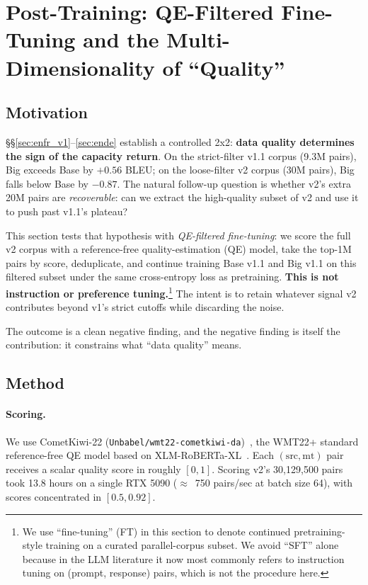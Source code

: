\section{Post-Training: QE-Filtered Fine-Tuning and the Multi-Dimensionality of ``Quality''}
\label{sec:sft}

\subsection{Motivation}
\S\S\ref{sec:enfr_v1}--\ref{sec:ende} establish a controlled 2x2: \textbf{data quality determines the sign of the capacity return}. On the strict-filter v1.1 corpus (9.3M pairs), Big exceeds Base by $+0.56$ BLEU; on the loose-filter v2 corpus (30M pairs), Big falls below Base by $-0.87$. The natural follow-up question is whether v2's extra 20M pairs are \emph{recoverable}: can we extract the high-quality subset of v2 and use it to push past v1.1's plateau?

This section tests that hypothesis with \emph{QE-filtered fine-tuning}: we score the full v2 corpus with a reference-free quality-estimation (QE) model, take the top-1M pairs by score, deduplicate, and continue training Base v1.1 and Big v1.1 on this filtered subset under the same cross-entropy loss as pretraining. \textbf{This is not instruction or preference tuning.}\footnote{We use ``fine-tuning'' (FT) in this section to denote continued pretraining-style training on a curated parallel-corpus subset. We avoid ``SFT'' alone because in the LLM literature it now most commonly refers to instruction tuning on (prompt, response) pairs, which is not the procedure here.} The intent is to retain whatever signal v2 contributes beyond v1's strict cutoffs while discarding the noise.

The outcome is a clean negative finding, and the negative finding is itself the contribution: it constrains what ``data quality'' means.

\subsection{Method}
\paragraph{Scoring.} We use CometKiwi-22 (\texttt{Unbabel/wmt22-cometkiwi-da})~\cite{rei2022cometkiwi}, the WMT22+ standard reference-free QE model based on XLM-RoBERTa-XL~\cite{conneau2020unsupervised}. Each $(\text{src}, \text{mt})$ pair receives a scalar quality score in roughly $[0, 1]$. Scoring v2's 30{,}129{,}500 pairs took 13.8 hours on a single RTX 5090 ($\approx$~750 pairs/sec at batch size 64), with scores concentrated in $[0.5, 0.92]$.

